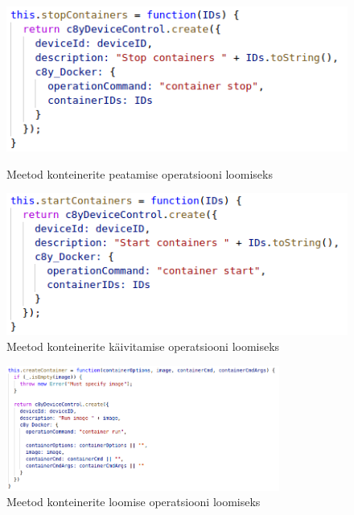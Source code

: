 \documentclass[12pt]{article}
\begin{document}
 
  \begin{figure} [ht]
   \centering
   \begin{minipage}{0.45\textwidth}
     \centering
     \includegraphics[width=1.0\textwidth]{webplugin_stopcontainers} %
     \caption{Meetod konteinerite peatamise operatsiooni loomiseks}
     \label{fig:webplugin_stopcontainers}
   \end{minipage}\hfill
   \begin{minipage}{0.45\textwidth}
     \centering
     \includegraphics[width=1.0\textwidth]{webplugin_startcontainers} %
     \caption{Meetod konteinerite käivitamise operatsiooni loomiseks}
     \label{fig:webplugin_startcontainers}
   \end{minipage}
  \end{figure}
   
  \FloatBarrier
  
  \begin{figure} [ht] %
  \begin{center}
  \includegraphics[width=0.8\textwidth]{webplugin_createcontainer}
  \caption{Meetod konteinerite loomise operatsiooni loomiseks}
  \label{fig:webplugin_createcontainer}
  \end{center}
  \end{figure}
  
\end{document}
